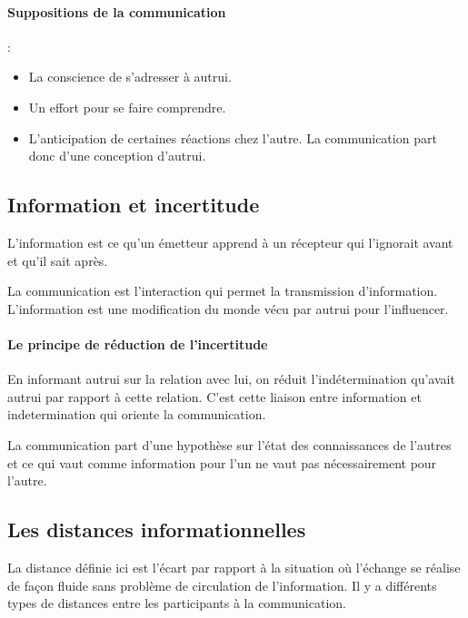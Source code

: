 \documentclass[11pt]{article} %
\begin{document}
\paragraph{Suppositions de la communication} :
\begin{itemize}
 \item La conscience de s'adresser à autrui.
 \item Un effort pour se faire comprendre.
 \item L'anticipation de certaines réactions chez l'autre. La
     communication part donc d'une conception d'autrui.
\end{itemize}


\subsection{Information et incertitude}

L'information est ce qu'un émetteur apprend à un récepteur qui
l'ignorait avant et qu'il sait après.

La communication est l'interaction qui permet la transmission
d'information. L'information est une modification du monde vécu par
autrui pour l'influencer.

\paragraph{Le principe de réduction de l'incertitude} 

En informant autrui sur la relation avec lui, on réduit
l'indétermination qu'avait autrui par rapport à cette relation. C'est
cette liaison entre information et indetermination qui oriente la
communication.

La communication part d'une hypothèse sur l'état des connaissances
de l'autres et ce qui vaut comme information pour l'un ne vaut pas
nécessairement pour l'autre.


\subsection{Les distances informationnelles}

La distance définie ici est l'écart par rapport à la situation où
l'échange se réalise de façon fluide sans problème de circulation
de l'information. Il y a différents types de distances entre les
participants à la communication.
\end{document}
